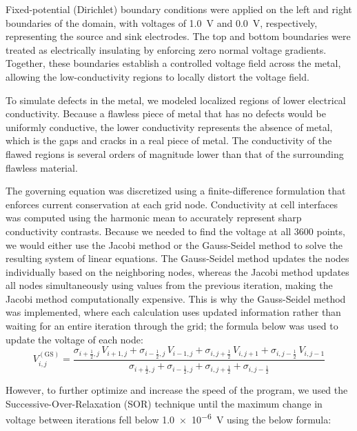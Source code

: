 \documentclass[10pt,journal,twoside]{IEEEtran} %
\begin{document}
Fixed-potential (Dirichlet) boundary conditions were applied on the left and right boundaries of the domain, with voltages of \qty{1.0}{\volt} and \qty{0.0}{\volt}, respectively, representing the source and sink electrodes. The top and bottom boundaries were treated as electrically insulating by enforcing zero normal voltage gradients. Together, these boundaries establish a controlled voltage field across the metal, allowing the low-conductivity regions to locally distort the voltage field.

To simulate defects in the metal, we modeled localized regions of lower electrical conductivity. Because a flawless piece of metal that has no defects would be uniformly conductive, the lower conductivity represents the absence of metal, which is the gaps and cracks in a real piece of metal. The conductivity of the flawed regions is several orders of magnitude lower than that of the surrounding flawless material. 

The governing equation was discretized using a finite-difference formulation that enforces current conservation at each grid node. Conductivity at cell interfaces was computed using the harmonic mean to accurately represent sharp conductivity contrasts. Because we needed to find the voltage at all 3600 points, we would either use the Jacobi method or the Gauss-Seidel method to solve the resulting system of linear equations. The Gauss-Seidel method updates the nodes individually based on the neighboring nodes, whereas the Jacobi method updates all nodes simultaneously using values from the previous iteration, making the Jacobi method computationally expensive. This is why the Gauss-Seidel method was implemented, where each calculation uses updated information rather than waiting for an entire iteration through the grid; the formula below was used to update the voltage of each node:
\vspace{1em}
\begin{equation} 
V_{i,j}^{(\mathrm{GS})} = \frac{\sigma_{i+\frac{1}{2},j} \, V_{i+1,j} + \sigma_{i-\frac{1}{2},j} \, V_{i-1,j} + \sigma_{i,j+\frac{1}{2}} \, V_{i,j+1} + \sigma_{i,j-\frac{1}{2}} \, V_{i,j-1}}{\sigma_{i+\frac{1}{2},j} + \sigma_{i-\frac{1}{2},j} + \sigma_{i,j+\frac{1}{2}} + \sigma_{i,j-\frac{1}{2}}}
\label{eq:Gauss-Seidel update formula}
\end{equation}



However, to further optimize and increase the speed of the program, we used the Successive-Over-Relaxation (SOR) technique until the maximum change in voltage between iterations fell below \qty{1.0e-6}{\volt} using the below formula:
\end{document}
